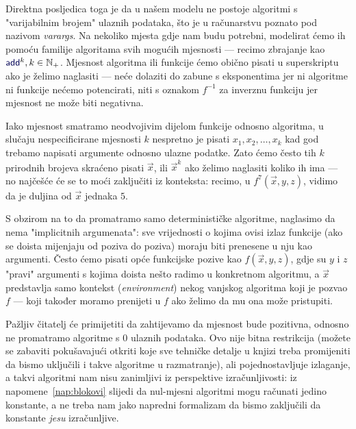 Direktna posljedica toga je da u našem modelu ne postoje algoritmi s "varijabilnim brojem" ulaznih podataka, što je u računarstvu poznato pod nazivom \emph{varargs}. Na nekoliko mjesta gdje nam budu potrebni, modelirat ćemo ih pomoću familije algoritama svih mogućih mjesnosti --- recimo zbrajanje kao $\f{add}^k,k\in\N_+$. Mjesnost algoritma ili funkcije ćemo obično pisati u superskriptu ako je želimo naglasiti --- neće dolaziti do zabune s eksponentima jer ni algoritme ni funkcije nećemo potencirati, niti s oznakom $f^{-1}$ za inverznu funkciju jer mjesnost ne može biti negativna.

Iako mjesnost smatramo neodvojivim dijelom funkcije odnosno algoritma, u slučaju nespecificirane mjesnosti $k$ nespretno je pisati $x_1,x_2,\dotsc,x_k$ kad god trebamo napisati argumente odnosno ulazne podatke. Zato ćemo često tih $k$ prirodnih brojeva skraćeno pisati $\vec x$, ili $\vec x^k$ ako želimo naglasiti koliko ih ima --- no najčešće će se to moći zaključiti iz konteksta: recimo, u $f^7(\vec x,y,z)$, vidimo da je duljina od $\vec x$ jednaka $5$.

\begin{napomena}[{name=[svi argumenti moraju biti eksplicitno navedeni]}]\label{nap:blokovi}
S obzirom na to da promatramo samo determinističke algoritme, naglasimo da nema "implicitnih argumenata": sve vrijednosti o kojima ovisi izlaz funkcije (ako se doista mijenjaju od poziva do poziva) moraju biti prenesene u nju kao argumenti. Često ćemo pisati opće funkcijske pozive kao $f(\vec x,y,z)$, gdje su $y$ i $z$ "pravi" argumenti s kojima doista nešto radimo u konkretnom algoritmu, a $\vec x$ predstavlja samo kontekst (\hspace{-1pt}\emph{environment}) nekog vanjskog algoritma koji je pozvao $f$ --- koji također moramo prenijeti u $f$ ako želimo da mu ona može pristupiti.
\end{napomena}

Pažljiv čitatelj će primijetiti da zahtijevamo da mjesnost bude pozitivna, odnosno ne promatramo algoritme s $0$ ulaznih podataka. Ovo nije bitna restrikcija (možete se zabaviti pokušavajući otkriti koje sve tehničke detalje u knjizi treba promijeniti da bismo uključili i takve algoritme u razmatranje), ali pojednostavljuje izlaganje, a takvi algoritmi nam nisu zanimljivi iz perspektive izračunljivosti: iz napomene~\ref{nap:blokovi} slijedi da nul-mjesni algoritmi mogu računati jedino konstante, a ne treba nam jako napredni formalizam da bismo zaključili da konstante \emph{jesu} izračunljive.

